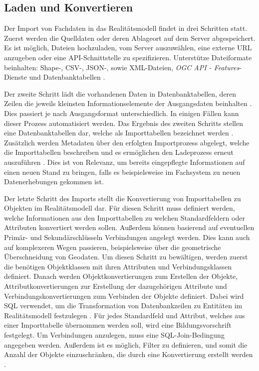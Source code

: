 \subsection{Laden und Konvertieren}
\label{sec:simplex-importer}

Der Import von Fachdaten in das Realitätsmodell findet in drei Schritten statt. Zuerst werden die Quelldaten oder deren Ablageort auf dem Server abgespeichert. Es ist möglich, Dateien hochzuladen, vom Server auszuwählen, eine externe \acs{URL} anzugeben oder eine \acs{API}-Schnittstelle zu spezifizieren. Unterstütze Dateiformate beinhalten: Shape-, \acs{CSV}-, \acs{JSON}-, sowie \acs{XML}-Dateien, \textit{OGC API - Features}-Dienste und Datenbanktabellen \parencite{simplex4datagmbhSimplex4TwIS}.

Der zweite Schritt lädt die vorhandenen Daten in Datenbanktabellen, deren Zeilen die jeweils kleinsten Informationselemente der Ausgangsdaten beinhalten \parencite{grossmannFachsystemeSchemaevolution2024}. Dies passiert je nach Ausgangsformat unterschiedlich. In einigen Fällen kann dieser Prozess automatisiert werden. Das Ergebnis des zweiten Schritts stellen eine Datenbanktabellen dar, welche als Importtabellen bezeichnet werden . Zusätzlich werden Metadaten über den erfolgten Importprozess abgelegt, welche die Importtabellen beschreiben und es ermöglichen den Ladeprozess erneut auszuführen \parencite{grossmannFachsystemeSchemaevolution2024}. Dies ist von Relevanz, um bereits eingepflegte Informationen auf einen neuen Stand zu bringen, falls es beispielsweise im Fachsystem zu neuen Datenerhebungen gekommen ist.

Der letzte Schritt des Imports stellt die Konvertierung von Importtabellen zu Objekten im Realitätsmodell dar. Für diesen Schritt muss definiert werden, welche Informationen aus den Importtabellen zu welchen Standardfeldern oder Attributen konvertiert werden sollen. Außerdem können basierend auf eventuellen Primär- und Sekundärschlüsseln Verbindungen angelegt werden. Dies kann auch auf komplexeren Wegen passieren, beispielsweise über die geometrische Überschneidung von Geodaten. Um diesen Schritt zu bewältigen, werden zuerst die benötigen Objektklassen mit ihren Attributen und Verbindungsklassen definiert. Danach werden Objektkonvertierungen zum Erstellen der Objekte, Attributkonvertierungen zur Erstellung der dazugehörigen Attribute und Verbindungskonvertierungen zum Verbinden der Objekte definiert. Dabei wird \acs{SQL} verwendet, um die Transformation von Datenbankzeilen zu Entitäten im Realitätsmodell festzulegen \parencite{grossmannFachsystemeSchemaevolution2024}. Für jedes Standardfeld und Attribut, welches aus einer Importtabelle übernommen werden soll, wird eine Bildungsvorschrift festgelegt. Um Verbindungen anzulegen, muss eine \acs{SQL}-Join-Bedingung angegeben werden. Außerdem ist es möglich, Filter zu definieren, und somit die Anzahl der Objekte einzuschränken, die durch eine Konvertierung erstellt werden \parencite{grossmannFachsystemeSchemaevolution2024}.
